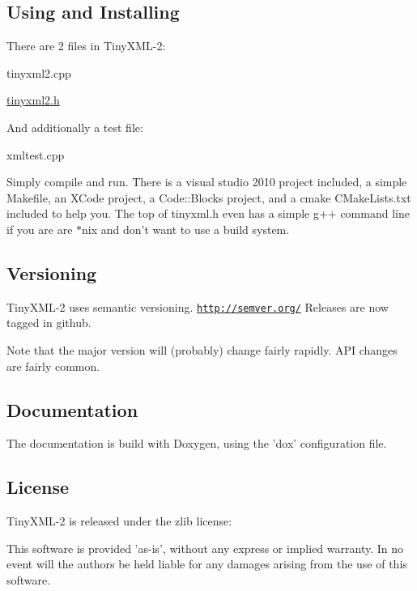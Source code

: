 \subsection*{Using and Installing }

There are 2 files in Tiny\+X\+M\+L-\/2\+:
\begin{DoxyItemize}
\item tinyxml2.\+cpp
\item \hyperlink{tinyxml2_8h_source}{tinyxml2.\+h}
\end{DoxyItemize}

And additionally a test file\+:
\begin{DoxyItemize}
\item xmltest.\+cpp
\end{DoxyItemize}

Simply compile and run. There is a visual studio 2010 project included, a simple Makefile, an X\+Code project, a Code\+::\+Blocks project, and a cmake C\+Make\+Lists.\+txt included to help you. The top of tinyxml.\+h even has a simple g++ command line if you are are $\ast$nix and don't want to use a build system.

\subsection*{Versioning }

Tiny\+X\+M\+L-\/2 uses semantic versioning. \href{http://semver.org/}{\tt http\+://semver.\+org/} Releases are now tagged in github.

Note that the major version will (probably) change fairly rapidly. A\+P\+I changes are fairly common.

\subsection*{Documentation }

The documentation is build with Doxygen, using the 'dox' configuration file.

\subsection*{License }

Tiny\+X\+M\+L-\/2 is released under the zlib license\+:

This software is provided 'as-\/is', without any express or implied warranty. In no event will the authors be held liable for any damages arising from the use of this software.

